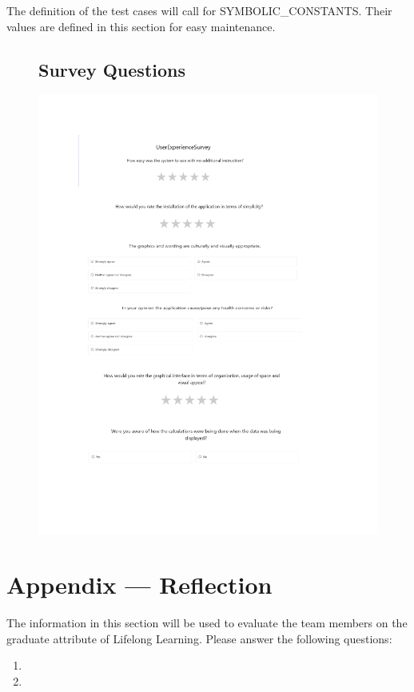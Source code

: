 \documentclass[12pt, titlepage]{article}
\begin{document}
The definition of the test cases will call for SYMBOLIC\_CONSTANTS.
Their values are defined in this section for easy maintenance.


\begin{figure}
  \subsection{Survey Questions}
  \centering
  \includegraphics[width=1\textwidth]{UserExperienceSurvey.pdf}
\end{figure}


\newpage{}
\section*{Appendix --- Reflection}

The information in this section will be used to evaluate the team members on the
graduate attribute of Lifelong Learning.  Please answer the following questions:

\begin{enumerate}
  \item 
  \item 
\end{enumerate}
\end{document}
